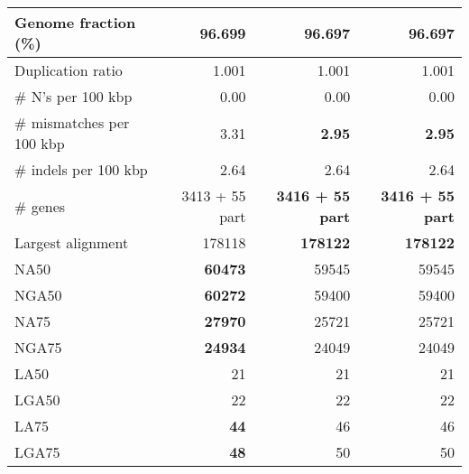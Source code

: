 \documentclass[12pt,a4paper]{article}
\begin{document}
\begin{table}[ht]
\begin{center}
\begin{tabular}{|l*{3}{|r}|}
Genome fraction (\%) & {\bf 96.699} & 96.697 & 96.697 \\ \hline
Duplication ratio & 1.001 & 1.001 & 1.001 \\ \hline
\# N's per 100 kbp & 0.00 & 0.00 & 0.00 \\ \hline
\# mismatches per 100 kbp & 3.31 & {\bf 2.95} & {\bf 2.95} \\ \hline
\# indels per 100 kbp & 2.64 & 2.64 & 2.64 \\ \hline
\# genes & 3413 + 55 part & {\bf 3416 + 55 part} & {\bf 3416 + 55 part} \\ \hline
Largest alignment & 178118 & {\bf 178122} & {\bf 178122} \\ \hline
NA50 & {\bf 60473} & 59545 & 59545 \\ \hline
NGA50 & {\bf 60272} & 59400 & 59400 \\ \hline
NA75 & {\bf 27970} & 25721 & 25721 \\ \hline
NGA75 & {\bf 24934} & 24049 & 24049 \\ \hline
LA50 & 21 & 21 & 21 \\ \hline
LGA50 & 22 & 22 & 22 \\ \hline
LA75 & {\bf 44} & 46 & 46 \\ \hline
LGA75 & {\bf 48} & 50 & 50 \\ \hline
\end{tabular}
\end{center}
\end{table}
\end{document}
